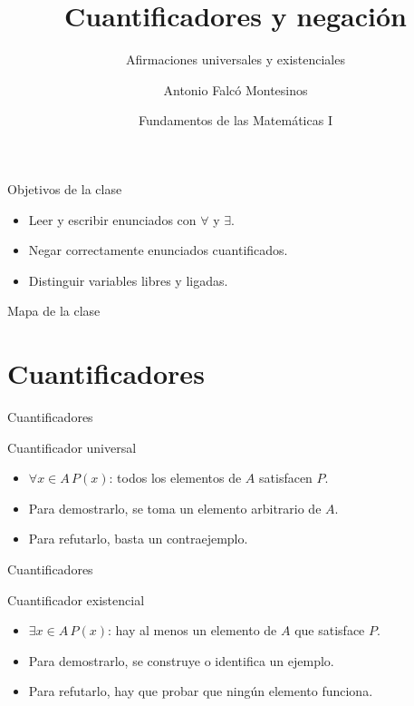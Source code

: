 \documentclass[aspectratio=169,11pt]{beamer}
\title[FdM I -- Clase 04]{Cuantificadores y negación}
\subtitle{Afirmaciones universales y existenciales}
\author{Antonio Falcó Montesinos}
\institute{Universidad CEU Cardenal Herrera}
\date{Fundamentos de las Matemáticas I}
\begin{document}
\begin{frame}
  \titlepage
\end{frame}

\begin{frame}{Objetivos de la clase}
\begin{itemize}
  \item Leer y escribir enunciados con \(\forall\) y \(\exists\).
  \item Negar correctamente enunciados cuantificados.
  \item Distinguir variables libres y ligadas.
\end{itemize}
\end{frame}

\begin{frame}{Mapa de la clase}
\tableofcontents
\end{frame}

\section{Cuantificadores}

\begin{frame}{Cuantificadores}
\begin{block}{Cuantificador universal}
\begin{itemize}
  \item \(\forall x\in A\, P(x)\): todos los elementos de \(A\) satisfacen \(P\).
  \item Para demostrarlo, se toma un elemento arbitrario de \(A\).
  \item Para refutarlo, basta un contraejemplo.
\end{itemize}
\end{block}
\end{frame}

\begin{frame}{Cuantificadores}
\begin{block}{Cuantificador existencial}
\begin{itemize}
  \item \(\exists x\in A\, P(x)\): hay al menos un elemento de \(A\) que satisface \(P\).
  \item Para demostrarlo, se construye o identifica un ejemplo.
  \item Para refutarlo, hay que probar que ningún elemento funciona.
\end{itemize}
\end{block}
\end{frame}
\end{document}
